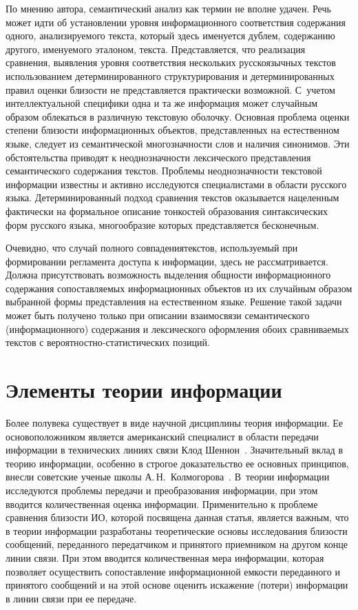 \begin{multicols}{2}
   По мнению автора, семантический анализ как термин не вполне удачен. 
Речь может идти об установлении уровня информационного соответствия 
содержания одного, анализируемого текста, который здесь именуется 
дублем, содержанию другого, именуемого эталоном, текста. Представляется, 
что реализация сравнения, выявления уровня соответствия нескольких 
русскоязычных текстов использованием детерминированного 
структурирования и детерминированных правил оценки близости не 
представляется практически возможной. С~учетом интеллектуальной 
специфики одна и та же информация может случайным образом облекаться в 
различную текстовую оболочку. Основная проб\-ле\-ма оценки степени 
близости информационных объектов, представленных на естественном 
языке, следует из семантической многозначности слов и наличия синонимов. 
Эти обстоятельства приводят к неоднозначности лексического представления 
семантического содержания текстов. Проблемы неоднозначности текстовой 
информации известны и активно исследуются специалистами в области 
русского языка. Детерминированный подход сравнения текстов оказывается 
нацеленным фактически на формальное описание тонкостей образования 
синтаксических форм русского языка, многообразие которых представляется 
бесконечным. 
   
   Очевидно, что случай полного совпадения\linebreak текстов, используемый при 
формировании рег\-ла\-мента доступа к информации, здесь не рас\-смат\-ри\-ва\-ет\-ся. 
Должна присутствовать возможность выделения общности 
информационного содержания со\-по\-став\-ля\-емых информационных объектов 
из их случайным образом выбранной формы представления на естественном 
языке. Решение такой задачи может быть получено только при описании 
взаимосвязи семантического (информационного) содержания и лексического 
оформления обоих срав\-ни\-ва\-емых текстов с вероятностно-статистических 
позиций.

\section{Элементы теории информации}

   Более полувека существует в виде научной дисциплины теория 
информации. Ее основоположником является американский специалист в 
об\-ласти передачи информации в технических линиях связи Клод 
   Шен\-нон~\cite{3-k}. Значительный вклад в теорию информации, 
особенно в строгое доказательство ее основных принципов, внесли советские\linebreak 
ученые школы А.\,Н.~Колмогорова~\cite{4-k}. В~теории информа\-ции 
исследуются проблемы передачи и преобразования информации, при этом 
вводится количественная оценка информации. Применительно к проблеме 
сравнения близости ИО, которой посвящена 
данная статья, является важным, что в теории информации разработаны 
теоретические основы исследования бли\-зости сообщений, переданного 
передатчиком и принятого приемником на другом конце линии связи. При 
этом вводится количественная мера информации, которая позволяет 
осуществить сопоставление информационной емкости переданного и 
принятого сообщений и на этой основе оценить искажение (потери) 
информации в линии связи при ее пе\-ре\-даче. 
   

\end{multicols}
